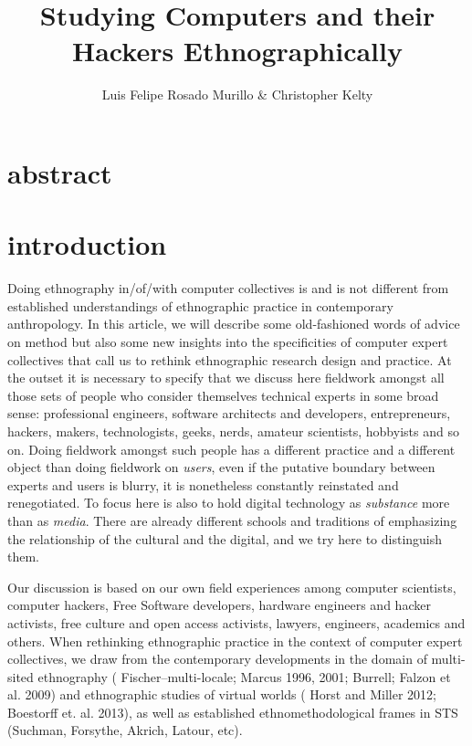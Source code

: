 \documentclass[10pt,letter,oneside]{scrartcl}
\author{Luis Felipe Rosado Murillo \& Christopher Kelty}
\title{Studying Computers and their Hackers Ethnographically}
\date{}
\begin{document}
\maketitle
\section{abstract}

\doublespacing
\section{introduction}

Doing ethnography in/of/with computer collectives is and is not
different from established understandings of ethnographic practice in
contemporary anthropology. In this article, we will describe some
old-fashioned words of advice on method but also some new insights
into the specificities of computer expert collectives that call us to
rethink ethnographic research design and practice.  At the outset it
is necessary to specify that we discuss here fieldwork amongst all
those sets of people who consider themselves technical experts in some
broad sense: professional engineers, software architects and
developers, entrepreneurs,  hackers, makers, technologists, geeks, nerds,
amateur scientists, hobbyists and so on.  Doing fieldwork amongst such
people has a different practice and a different object than doing
fieldwork on \emph{users}, even if the putative boundary between
experts and users is blurry, it is nonetheless constantly reinstated and
renegotiated.  To focus here is also to hold digital technology as
\emph{substance} more than as \emph{media}.  There are already
different schools and traditions of emphasizing the relationship of
the cultural and the digital, and we try here to distinguish them.

Our discussion is based on our own field experiences among computer
scientists, computer hackers, Free Software developers, hardware
engineers and hacker activists, free culture and open access
activists, lawyers, engineers, academics and others.  When rethinking
ethnographic practice in the context of computer expert collectives,
we draw from the contemporary developments in the domain of
multi-sited ethnography (\cite{Fischer1999,Marcus1995,Burrell2009}
Fischer--multi-locale; Marcus 1996, 2001;
Burrell; Falzon et al. 2009) and ethnographic studies of virtual
worlds (\cite{BOELLSTORFF2008,Miller2001} Horst and Miller 2012; Boestorff et.
al. 2013), as well as established ethnomethodological frames in STS (Suchman,
Forsythe, Akrich, Latour, etc). %
\end{document}
